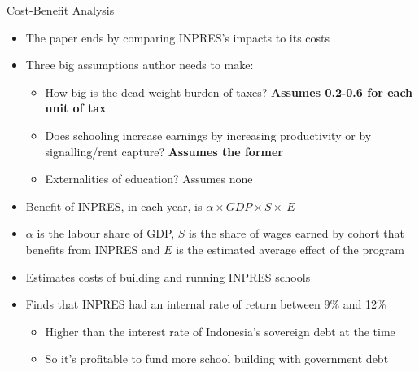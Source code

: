 \documentclass[11pt,notes=hide,aspectratio=169,mathserif]{beamer}
\begin{document}
\begin{frame}{Cost-Benefit Analysis}
\begin{itemize}
\item The paper ends by comparing INPRES's impacts to its costs
 \item Three big assumptions author needs to make:
\begin{itemize}
      \item  How big is the dead-weight burden of taxes?  \textbf{Assumes 0.2-0.6 for each unit of tax}
      \item  Does schooling increase earnings by increasing productivity or by signalling/rent capture?  \textbf{Assumes the former}
      \item  Externalities of education? Assumes none
\end{itemize}
 \item  Benefit of INPRES, in each year, is $\alpha\times GDP \times S\times\ E$
 \item $\alpha$ is the labour share of GDP, $S$ is the share of wages earned by cohort that benefits from INPRES and $E$ is the estimated average effect of the program
 \item  Estimates costs of building and running INPRES schools
 \item  Finds that INPRES had an internal rate of return between 9\% and 12\%
\begin{itemize}
     \item Higher than the interest rate of Indonesia's sovereign debt at the time
     \item So it's profitable to fund more school building with government debt
\end{itemize}
\end{itemize}
\end{frame}
\end{document}
